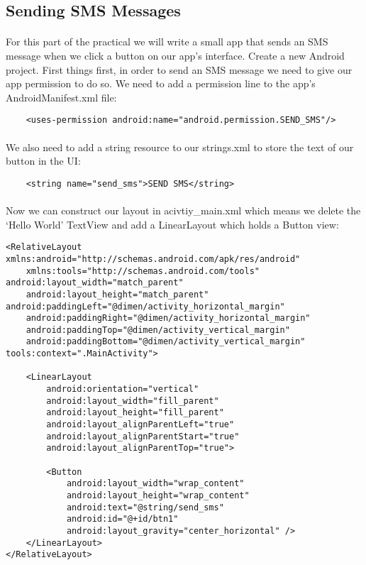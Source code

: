 \subsection{Sending SMS Messages}
\paragraph{} For this part of the practical we will write a small app that sends an SMS message when we click a button on our app's interface. Create a new Android project. First things first, in order to send an SMS message we need to give our app permission to do so. We need to add a permission line to the app's AndroidManifest.xml file:

\begin{lstlisting}
    <uses-permission android:name="android.permission.SEND_SMS"/>
\end{lstlisting}

\paragraph{} We also need to add a string resource to our strings.xml to store the text of our button in the UI:

\begin{lstlisting}
    <string name="send_sms">SEND SMS</string>
\end{lstlisting}

\paragraph{} Now we can construct our layout in acivtiy\_main.xml which means we delete the `Hello World' TextView and add a LinearLayout which holds a Button view:

\begin{lstlisting}
<RelativeLayout xmlns:android="http://schemas.android.com/apk/res/android"
    xmlns:tools="http://schemas.android.com/tools" android:layout_width="match_parent"
    android:layout_height="match_parent" android:paddingLeft="@dimen/activity_horizontal_margin"
    android:paddingRight="@dimen/activity_horizontal_margin"
    android:paddingTop="@dimen/activity_vertical_margin"
    android:paddingBottom="@dimen/activity_vertical_margin" tools:context=".MainActivity">

    <LinearLayout
        android:orientation="vertical"
        android:layout_width="fill_parent"
        android:layout_height="fill_parent"
        android:layout_alignParentLeft="true"
        android:layout_alignParentStart="true"
        android:layout_alignParentTop="true">

        <Button
            android:layout_width="wrap_content"
            android:layout_height="wrap_content"
            android:text="@string/send_sms"
            android:id="@+id/btn1"
            android:layout_gravity="center_horizontal" />
    </LinearLayout>
</RelativeLayout>
\end{lstlisting}

